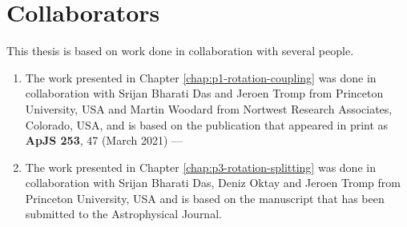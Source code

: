 \thispagestyle{plain}
\section*{Collaborators}
This thesis is based on work done in collaboration with several people.

\begin{enumerate}
    \item The work presented in Chapter \ref{chap:p1-rotation-coupling} 
    was done in collaboration with Srijan Bharati Das and Jeroen Tromp 
    from Princeton University, USA and Martin Woodard from Nortwest 
    Research Associates, Colorado, USA, and is based on the publication 
    that appeared in print as \textbf{ApJS 253}, 47 (March 2021) ---
    \citep{SGK-2021-ApJS}
    
    \item The work presented in Chapter \ref{chap:p3-rotation-splitting} 
    was done in collaboration with Srijan Bharati Das, Deniz Oktay and Jeroen Tromp 
    from Princeton University, USA and is based on the manuscript that 
    has been submitted to the Astrophysical Journal.
\end{enumerate}
